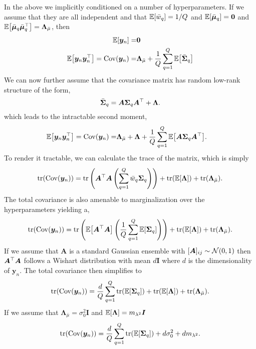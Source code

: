 \documentclass{article}
\newcommand{\mix}{\bm{A}}
\newcommand{\obs}{y}
\newcommand{\obsvec}{\bm{\obs}}
\newcommand{\mean}{\mu}
\newcommand{\meanvec}{\bm{\mean}}
\newcommand{\scale}{\sigma}
\newcommand{\scalesq}{\scale^2}
\newcommand{\sourcecov}{\bm{\Sigma}}
\newcommand{\weight}{w}
\newcommand{\compweight}{\bar{\weight}}
\newcommand{\compmean}{\bar{\mean}}
\newcommand{\compmeanvec}{\bar{\meanvec}}
\newcommand{\compcov}{\bar{\bm{\Sigma}}}
\newcommand{\noisecov}{\bm{\Lambda}}
\newcommand{\noisescalesq}{\lambda^2}
\begin{document}
In the above we implicitly conditioned on a number of hyperparameters. If we assume that they are all independent and that $\E{\compweight_q}=1/Q$ and $\E{\compmeanvec_q}=\bm{0}$ and $\E{\compmeanvec_q\compmeanvec_q\T}=\noisecov_{\compmean}$, then
\begin{align}
\E{\obsvec_n}=&\bm{0}\\
\label{eq:margcov}
\E{\obsvec_n\obsvec_n\T}=\Cov{\obsvec_n}=&\noisecov_{\compmean}+\frac{1}{Q}\sum_{q=1}^{Q}\E{\compcov_q}
\end{align} 
We can now further assume that the covariance matrix has random low-rank structure of the form,
\begin{equation}
\compcov_q=\mix \sourcecov_q\mix\T+\noisecov.
\end{equation}
which leads to the intractable second moment,
\begin{align}
\E{\obsvec_n\obsvec_n\T}=\Cov{\obsvec_n}=&\noisecov_{\compmean}+\noisecov+\frac{1}{Q}\sum_{q=1}^{Q}\E{\mix\sourcecov_q\mix\T}.
\end{align}
To render it tractable, we can calculate the trace of the matrix, which is simply
\begin{equation}
\trace(\Cov{\obsvec_n})=\trace\left(\mix\T\mix\left(\sum_{q=1}^{Q}\compweight_q\sourcecov_q\right)\right)+\trace(\E{\noisecov})+\trace(\noisecov_{\compmean}).
\end{equation}
The total covariance is also amenable to marginalization over the hyperparameters yielding a, 
\begin{equation}
\trace(\Cov{\obsvec_n})=\trace\left(\E{\mix\T\mix}\left(\frac{1}{Q}\sum_{q=1}^{Q}\E{\sourcecov_q}\right)\right)+\trace(\E{\noisecov})+\trace(\noisecov_{\compmean}).
\end{equation}
If we assume that $\mix$ is a standard Gaussian ensemble with $[\mix]_{ij}\sim \gaussrnd(0,1)$ then $\mix\T\mix$ follows a Wishart distribution with mean $d\bm{I}$ where $d$ is the dimensionality of $\obsvec_n$. The total covariance then simplifies to 
\begin{equation}
\label{eq:totalcov}
\trace(\Cov{\obsvec_n})=\frac{d}{Q}\sum_{q=1}^{Q}\trace(\E{\sourcecov_q})+\trace(\E{\noisecov})+\trace(\noisecov_{\compmean}).
\end{equation}
If we assume that $\noisecov_{\compmean}=\scalesq_0\bm{I}$ and $\E{\noisecov}=m_{\noisescalesq}\bm{I}$
\begin{equation}
\label{eq:totalcov_diag}
\trace(\Cov{\obsvec_n})=\frac{d}{Q}\sum_{q=1}^{Q}\trace(\E{\sourcecov_q})+d\sigma_0^2+dm_{\noisescalesq}.
\end{equation}
\end{document}
